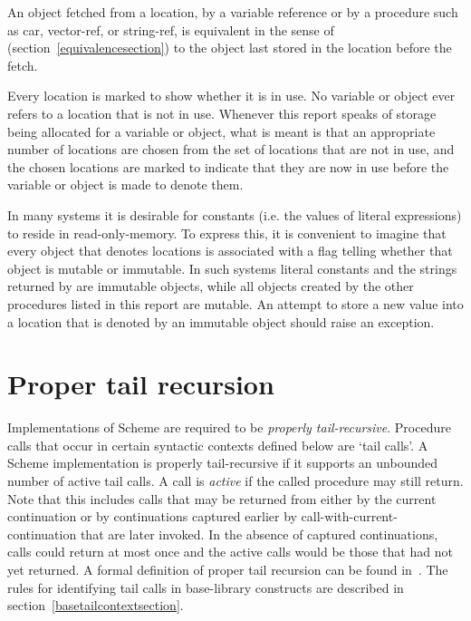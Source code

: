 An object fetched from a location, by a variable reference or by
a procedure such as {\cf car}, {\cf vector-ref}, or {\cf string-ref}, is
equivalent in the sense of  %
(section~\ref{equivalencesection})
to the object last stored in the location before the fetch.

Every location is marked to show whether it is in use.
No variable or object ever refers to a location that is not in use.
Whenever this report speaks of storage being allocated for a variable
or object, what is meant is that an appropriate number of locations are
chosen from the set of locations that are not in use, and the chosen
locations are marked to indicate that they are now in use before the variable
or object is made to denote them.

In many systems it is desirable for constants (i.e. the values of
literal expressions) to reside in read-only-memory.  To express this, it is
convenient to imagine that every object that denotes locations is associated
with a flag telling whether that object is mutable or
immutable.  In such systems literal constants and the strings
returned by  are immutable objects, while all objects
created by the other procedures listed in this report are mutable.  An
attempt to store a new value into a location that is denoted by an
immutable object should raise an exception.

\section{Proper tail recursion}
\label{proper tail recursion}

Implementations of Scheme are required to be
{\em properly tail-recursive}.
Procedure calls that occur in certain syntactic
contexts defined below are `tail calls'.  A Scheme implementation is
properly tail-recursive if it supports an unbounded number of active
tail calls.  A call is {\em active} if the called procedure may still
return.  Note that this includes calls that may be returned from either
by the current continuation or by continuations captured earlier by
{\cf call-with-current-continuation} that are later invoked.
In the absence of captured continuations, calls could
return at most once and the active calls would be those that had not
yet returned.
A formal definition of proper tail recursion can be found
in~\cite{propertailrecursion}.  The rules for identifying tail calls
in base-library constructs are described in
section~\ref{basetailcontextsection}.

